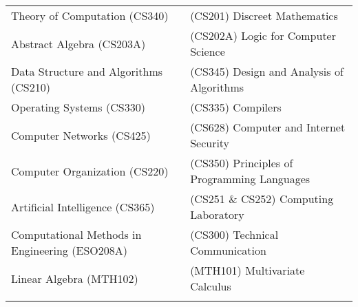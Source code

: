 \documentclass[a4paper,10pt]{article} %
\begin{document}
\begin{tabular}{>{\raggedleft}p{8cm}|p{8cm}}

    Theory of Computation (CS340) & (CS201) Discreet Mathematics \\
    Abstract Algebra (CS203A) & (CS202A) Logic for Computer Science \\
    Data Structure and Algorithms (CS210) & (CS345) Design and Analysis of Algorithms \\
    Operating Systems (CS330) & (CS335) Compilers \\
    Computer Networks (CS425) &  (CS628) Computer and Internet Security \\
    Computer Organization (CS220) & (CS350) Principles of Programming Languages \\
    Artificial Intelligence (CS365) & (CS251 \& CS252) Computing Laboratory \\
    Computational Methods in Engineering (ESO208A) & (CS300) Technical Communication \\
    Linear Algebra (MTH102) &  (MTH101) Multivariate Calculus \\
                     \\
\end{tabular}
\end{document}
